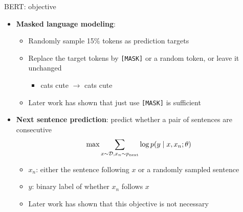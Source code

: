 \documentclass[usenames,dvipsnames,notes,11pt,aspectratio=169,hyperref={colorlinks=true, linkcolor=blue}]{beamer}
\begin{document}
\begin{frame}
    {BERT: objective}

        \begin{itemize}
            \item \textbf{Masked language modeling}:
                \begin{itemize}
                    \item Randomly sample 15\% tokens as prediction targets
                    \item Replace the target tokens by \texttt{[MASK]} or a random token, or leave it unchanged
                        \begin{itemize}
                            \item[] cats  cute $\rightarrow$
                        cats  cute
                        \end{itemize}
                    \item Later work has shown that just use \texttt{[MASK]} is sufficient
                \end{itemize}
            \pause
            \item \textbf{Next sentence prediction}: predict whether a pair of sentences are consecutive
                $$
                \max \sum_{x\sim\mathcal{D}, x_{n}\sim p_{\text{next}}} \log p(y\mid x, x_n; \theta)
                $$
                \vspace{-1em}
                \begin{itemize}
                    \item $x_n$: either the sentence following $x$ or a randomly sampled sentence
                    \item $y$: binary label of whether $x_n$ follows $x$
                    \item Later work has shown that this objective is not necessary 
                \end{itemize}
        \end{itemize}
\end{frame}
\end{document}

